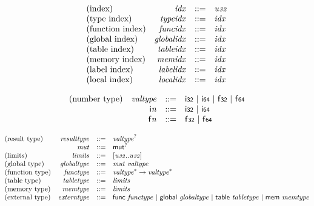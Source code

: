 $$
\begin{array}{@{}lrrl@{}l@{}}
\mbox{(index)} & {\mathit{idx}} &::=& {\mathit{u{\scriptstyle32}}} \\
\mbox{(type index)} & {\mathit{typeidx}} &::=& {\mathit{idx}} \\
\mbox{(function index)} & {\mathit{funcidx}} &::=& {\mathit{idx}} \\
\mbox{(global index)} & {\mathit{globalidx}} &::=& {\mathit{idx}} \\
\mbox{(table index)} & {\mathit{tableidx}} &::=& {\mathit{idx}} \\
\mbox{(memory index)} & {\mathit{memidx}} &::=& {\mathit{idx}} \\
\mbox{(label index)} & {\mathit{labelidx}} &::=& {\mathit{idx}} \\
\mbox{(local index)} & {\mathit{localidx}} &::=& {\mathit{idx}} \\
\end{array}
$$

\vspace{1ex}

$$
\begin{array}{@{}lrrl@{}l@{}}
\mbox{(number type)} & {\mathit{valtype}} &::=& \mathsf{i{\scriptstyle32}} ~|~ \mathsf{i{\scriptstyle64}} ~|~ \mathsf{f{\scriptstyle32}} ~|~ \mathsf{f{\scriptstyle64}} \\
& {\mathsf{i}}{{\mathit{n}}} &::=& \mathsf{i{\scriptstyle32}} ~|~ \mathsf{i{\scriptstyle64}} \\
& {\mathsf{f}}{{\mathit{n}}} &::=& \mathsf{f{\scriptstyle32}} ~|~ \mathsf{f{\scriptstyle64}} \\
\end{array}
$$

$$
\begin{array}{@{}lrrl@{}l@{}}
\mbox{(result type)} & {\mathit{resulttype}} &::=& {{\mathit{valtype}}^?} \\
& {\mathit{mut}} &::=& {\mathsf{mut}^?} \\
\mbox{(limits)} & {\mathit{limits}} &::=& {}[{\mathit{u{\scriptstyle32}}} .. {\mathit{u{\scriptstyle32}}}] \\
\mbox{(global type)} & {\mathit{globaltype}} &::=& {\mathit{mut}}~{\mathit{valtype}} \\
\mbox{(function type)} & {\mathit{functype}} &::=& {{\mathit{valtype}}^\ast} \rightarrow {{\mathit{valtype}}^\ast} \\
\mbox{(table type)} & {\mathit{tabletype}} &::=& {\mathit{limits}} \\
\mbox{(memory type)} & {\mathit{memtype}} &::=& {\mathit{limits}} \\
\mbox{(external type)} & {\mathit{externtype}} &::=& \mathsf{func}~{\mathit{functype}} ~|~ \mathsf{global}~{\mathit{globaltype}} ~|~ \mathsf{table}~{\mathit{tabletype}} ~|~ \mathsf{mem}~{\mathit{memtype}} \\
\end{array}
$$

